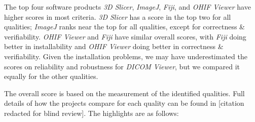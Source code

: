\documentclass[doubleblind,12pt, 3p, times]{elsarticle}
\begin{document}
The top four software products \textit{3D Slicer}, \textit{ImageJ},
\textit{Fiji}, and \textit{OHIF Viewer} have higher scores in most criteria.
\textit{3D Slicer} has a score in the top two for all qualities; \textit{ImageJ}
ranks near the top for all qualities, except for correctness \& verifiability.
\textit{OHIF Viewer} and \textit{Fiji} have similar overall scores, with
\textit{Fiji} doing better in installability and \textit{OHIF Viewer} doing
better in correctness \& verifiability.  Given the installation problems, we may
have underestimated the scores on reliability and robustness for \textit{DICOM
Viewer}, but we compared it equally for the other qualities.

The overall score is based on the measurement of the identified qualities. Full
details of how the projects compare for each quality can be found in [citation
redacted for blind review].
The highlights are as follows:
\end{document}
